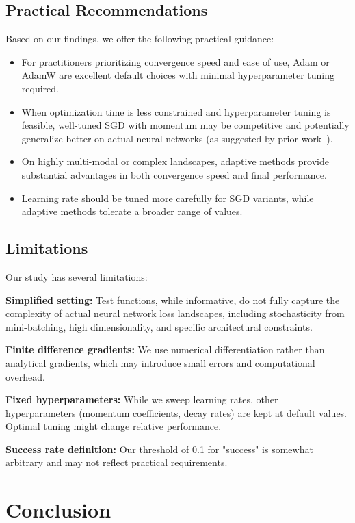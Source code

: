 \documentclass[12pt,a4paper]{article}
\begin{document}
\subsection{Practical Recommendations}

Based on our findings, we offer the following practical guidance:

\begin{itemize}
    \item For practitioners prioritizing convergence speed and ease of use, Adam or AdamW are excellent default choices with minimal hyperparameter tuning required.
    \item When optimization time is less constrained and hyperparameter tuning is feasible, well-tuned SGD with momentum may be competitive and potentially generalize better on actual neural networks (as suggested by prior work~\cite{wilson2017marginal}).
    \item On highly multi-modal or complex landscapes, adaptive methods provide substantial advantages in both convergence speed and final performance.
    \item Learning rate should be tuned more carefully for SGD variants, while adaptive methods tolerate a broader range of values.
\end{itemize}

\subsection{Limitations}

Our study has several limitations:

\textbf{Simplified setting:} Test functions, while informative, do not fully capture the complexity of actual neural network loss landscapes, including stochasticity from mini-batching, high dimensionality, and specific architectural constraints.

\textbf{Finite difference gradients:} We use numerical differentiation rather than analytical gradients, which may introduce small errors and computational overhead.

\textbf{Fixed hyperparameters:} While we sweep learning rates, other hyperparameters (momentum coefficients, decay rates) are kept at default values. Optimal tuning might change relative performance.

\textbf{Success rate definition:} Our threshold of 0.1 for "success" is somewhat arbitrary and may not reflect practical requirements.

\section{Conclusion}
\label{sec:conclusion}
\end{document}
